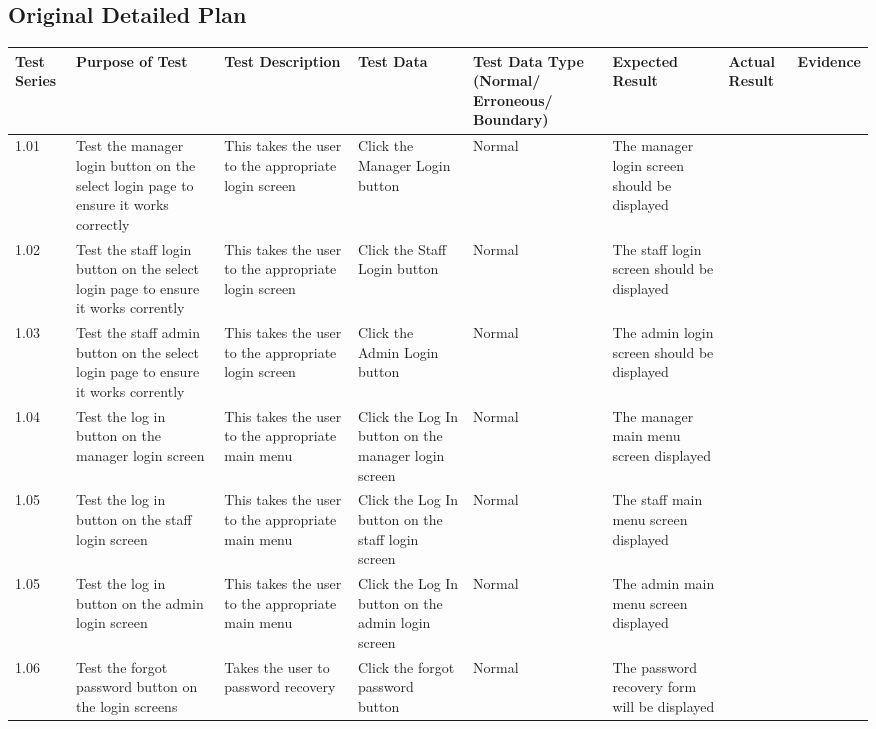 \begin{landscape}
\begin{center}
\begin{tabular}{|p{2cm}|p{5cm}|p{5cm}|p{4cm}|}
    \end{tabular}
\end{center}


\subsection{Original Detailed Plan}

\begin{center}
    \begin{longtable}{|p{1.5cm}|p{2cm}|p{2.5cm}|p{4cm}|p{2cm}|p{2cm}|p{1cm}|p{1.7cm}|}
        \hline
        \textbf{Test Series} & \textbf{Purpose of Test} & \textbf{Test Description} & \textbf{Test Data} & \textbf{Test Data Type (Normal/ Erroneous/ Boundary)} & \textbf{Expected Result} & \textbf{Actual Result} & \textbf{Evidence}\\ \hline
1.01 & Test the manager login button on the select login page to ensure it works correctly  & This takes the user to the appropriate login screen & Click the Manager Login button & Normal & The manager login screen should be displayed && \\ \hline
1.02 & Test the staff login button on the select login page to ensure it works corrently & This takes the user to the appropriate login screen & Click the Staff Login button & Normal & The staff login screen should be displayed && \\ \hline
1.03 & Test the staff admin button on the select login page to ensure it works corrently & This takes the user to the appropriate login screen & Click the Admin Login button & Normal & The admin login screen should be displayed && \\ \hline
1.04 & Test the log in button on the manager login screen  & This takes the user to the appropriate main menu & Click the Log In button on the manager login screen & Normal & The manager main menu screen displayed && \\ \hline
1.05 & Test the log in button on the staff login screen  & This takes the user to the appropriate main menu & Click the Log In button on the staff login screen & Normal & The staff main menu screen displayed && \\ \hline
1.05 & Test the log in button on the admin login screen  & This takes the user to the appropriate main menu & Click the Log In button on the admin login screen & Normal & The admin main menu screen displayed && \\ \hline
1.06 & Test the forgot password button on the login screens & Takes the user to password recovery & Click the forgot password button & Normal & The password recovery form will be displayed && \\ \hline

\end{longtable}
\end{center}
\end{landscape}
